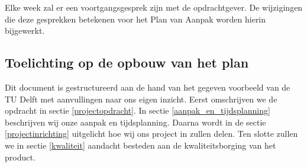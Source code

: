 Elke week zal er een voortgangsgesprek zijn met de opdrachtgever.
De wijzigingen die deze gesprekken betekenen voor het Plan van Aanpak worden hierin bijgewerkt.

\subsection{Toelichting op de opbouw van het plan}


Dit document is gestructureerd aan de hand van het gegeven voorbeeld van de TU Delft met aanvullingen naar ons eigen inzicht.
Eerst omschrijven we de opdracht in sectie \ref{projectopdracht}.
In sectie \ref{aanpak_en_tijdsplanning} beschrijven wij onze aanpak en tijdsplanning.
Daarna wordt in de sectie \ref{projectinrichting} uitgelicht hoe wij ons project in zullen delen.
Ten slotte zullen we in sectie \ref{kwaliteit} aandacht besteden aan de kwaliteitsborging van het product.
